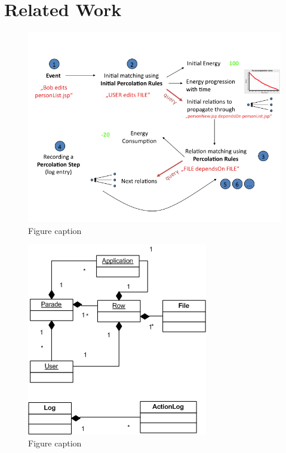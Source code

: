 \documentclass{ecscw2007}
\begin{document}
\section*{Related Work} 


\begin{figure}[htb]
  \centering
  \includegraphics[width=.7\linewidth]{figures/aether-mechanism}
  \caption{Figure caption}
  \label{fig:figure1}
\end{figure}

\begin{figure}[htb]
  \centering
  \includegraphics[width=.7\linewidth]{figures/parade-data-model}
  \caption{Figure caption}
  \label{fig:figure2}
\end{figure}
\end{document}
